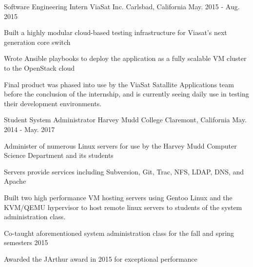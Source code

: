 \begin{cventries}
%
  \cventry
    {Software Engineering Intern} %
    {ViaSat Inc.} %
    {Carlsbad, California} %
    {May. 2015 - Aug. 2015} %
    {
      \begin{cvitems} %
        \item {Built a highly modular cloud-based testing infrastructure for Viasat's next generation core switch}
        \item {Wrote Ansible playbooks to deploy the application as a fully scalable VM cluster to the OpenStack cloud}
        \item {
          Final product was phased into use by the ViaSat Satallite Applications
          team before the conclusion of the internship, and is currently seeing
          daily use in testing their development environments. 
        }
      \end{cvitems}
    }

  \cventry
    {Student System Administrator} %
    {Harvey Mudd College} %
    {Claremont, California} %
    {May. 2014 - May. 2017} %
    {
      \begin{cvitems} %
        \item {Administer of numerous Linux servers for use by the Harvey Mudd Computer Science Department and its students}
        \item {Servers provide services including Subversion, Git, Trac, NFS, LDAP, DNS, and Apache}
        \item {
          Built two high performance VM hosting servers using Gentoo Linux and
          the KVM/QEMU hypervisor to host remote linux servers to students of
          the system administration class.
        }
        \item{Co-taught aforementioned system administration class for the fall and spring semesters 2015}
        \item{Awarded the JArthur award in 2015 for exceptional performance}
      \end{cvitems}
    }

\end{cventries}
